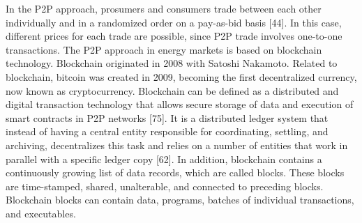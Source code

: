 In the P2P approach, prosumers and consumers trade between each other individually and in a randomized order on a pay-as-bid basis [44]. In this case, different prices for each trade are possible, since P2P trade involves one-to-one transactions. The P2P approach in energy markets is based on blockchain technology. Blockchain originated in 2008 with Satoshi Nakamoto. Related to blockchain, bitcoin was created in 2009, becoming the first decentralized currency, now known as cryptocurrency. Blockchain can be defined as a distributed and digital transaction technology that allows secure storage of data and execution of smart contracts in P2P networks [75]. It is a distributed ledger system that instead of having a central entity responsible for coordinating, settling, and archiving, decentralizes this task and relies on a number of entities that work in parallel with a specific ledger copy [62].
In addition, blockchain contains a continuously growing list of data records, which are called blocks. These blocks are time-stamped, shared, unalterable, and connected to preceding blocks. Blockchain blocks can contain data, programs, batches of individual transactions, and executables.

